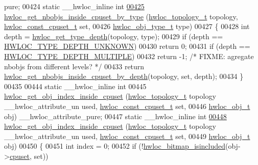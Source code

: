\begin{DoxyCode}
      pure;
00424 \textcolor{keyword}{static} \_\_hwloc\_inline \textcolor{keywordtype}{int}
\hypertarget{a00031_source_l00425}{}\hyperlink{a00054_ga63481874c69ed257b1a0c03e7615ff97}{00425} \hyperlink{a00054_ga63481874c69ed257b1a0c03e7615ff97}{hwloc_get_nbobjs_inside_cpuset_by_type} (\hyperlink{a00039_ga9d1e76ee15a7dee158b786c30b6a6e38}{hwloc_topology_t} topology, 
      \hyperlink{a00040_ga1f784433e9b606261f62d1134f6a3b25}{hwloc_const_cpuset_t} \textcolor{keyword}{set},
00426                                         \hyperlink{a00041_gacd37bb612667dc437d66bfb175a8dc55}{hwloc_obj_type_t} type)
00427 \{
00428   \textcolor{keywordtype}{int} depth = \hyperlink{a00046_gaea7c64dd59467f5201ba87712710b14d}{hwloc_get_type_depth}(topology, type);
00429   \textcolor{keywordflow}{if} (depth == \hyperlink{a00046_ggaf4e663cf42bbe20756b849c6293ef575a0565ab92ab72cb0cec91e23003294aad}{HWLOC_TYPE_DEPTH_UNKNOWN})
00430     \textcolor{keywordflow}{return} 0;
00431   \textcolor{keywordflow}{if} (depth == \hyperlink{a00046_ggaf4e663cf42bbe20756b849c6293ef575ae99465995cacde6c210d5fc2e409798c}{HWLOC_TYPE_DEPTH_MULTIPLE})
00432     \textcolor{keywordflow}{return} -1; \textcolor{comment}{/* FIXME: agregate nbobjs from different levels? */}
00433   \textcolor{keywordflow}{return} \hyperlink{a00054_ga457604a2dedbf70ba3b480558666b56b}{hwloc_get_nbobjs_inside_cpuset_by_depth}(topology, \textcolor{keyword}{set}, depth);
00434 \}
00435 
00444 \textcolor{keyword}{static} \_\_hwloc\_inline \textcolor{keywordtype}{int}
00445 \hyperlink{a00054_ga7cdb6a4645e9b1ec80137e72d1736fdd}{hwloc_get_obj_index_inside_cpuset} (\hyperlink{a00039_ga9d1e76ee15a7dee158b786c30b6a6e38}{hwloc_topology_t} topology \_\_hwloc\_attribute\_un
      used, \hyperlink{a00040_ga1f784433e9b606261f62d1134f6a3b25}{hwloc_const_cpuset_t} \textcolor{keyword}{set},
00446                                    \hyperlink{a00016}{hwloc_obj_t} obj) \_\_hwloc\_attribute\_pure;
00447 \textcolor{keyword}{static} \_\_hwloc\_inline \textcolor{keywordtype}{int}
\hypertarget{a00031_source_l00448}{}\hyperlink{a00054_ga7cdb6a4645e9b1ec80137e72d1736fdd}{00448} \hyperlink{a00054_ga7cdb6a4645e9b1ec80137e72d1736fdd}{hwloc_get_obj_index_inside_cpuset} (\hyperlink{a00039_ga9d1e76ee15a7dee158b786c30b6a6e38}{hwloc_topology_t} topology \_\_hwloc\_attribute\_un
      used, \hyperlink{a00040_ga1f784433e9b606261f62d1134f6a3b25}{hwloc_const_cpuset_t} \textcolor{keyword}{set},
00449                                    \hyperlink{a00016}{hwloc_obj_t} obj)
00450 \{
00451   \textcolor{keywordtype}{int} index = 0;
00452   \textcolor{keywordflow}{if} (!\hyperlink{a00065_gaae29e14a926c198e8f91e6e4790621e7}{hwloc_bitmap_isincluded}(obj->\hyperlink{a00016_a67925e0f2c47f50408fbdb9bddd0790f}{cpuset}, \textcolor{keyword}{set}))

\end{DoxyCode}

